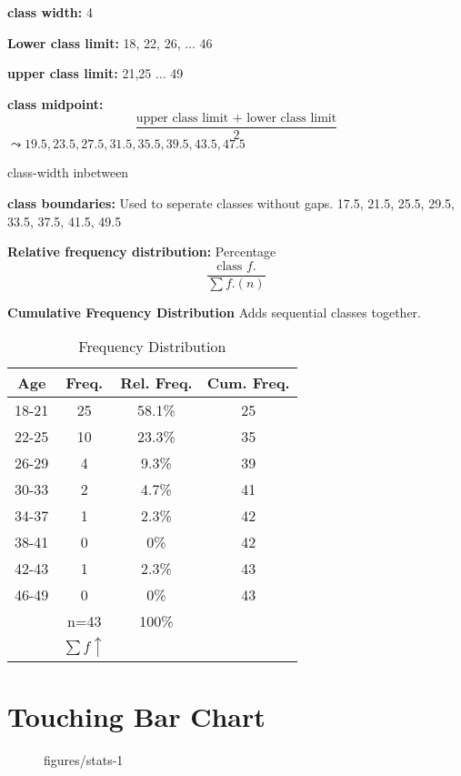 \documentclass{book}
\begin{document}
\begin{multicols}{2}
    

\textbf{class width:} 4

\textbf{Lower class limit:} 18, 22, 26, $\ldots$ 46

\textbf{upper class limit:} 21,25 $\ldots$ 49

\textbf{class midpoint:}
\[ \frac{\text{upper class limit + lower class limit}}{2}\] 
$\leadsto 19.5, 23.5, 27.5, 31.5, 35.5, 39.5, 43.5, 47.5$

class-width inbetween

\textbf{class boundaries:}
Used to seperate classes without gaps.
17.5, 21.5, 25.5, 29.5, 33.5, 37.5, 41.5, 49.5

\textbf{Relative frequency distribution:} Percentage \[\frac{\text{class } f.}{\sum f. (n)}\]

\textbf{Cumulative Frequency Distribution}
Adds sequential classes together.
\end{multicols}

\begin{table}[htbp]
    \centering
    \begin{tabular}{c|c|c|c}
        \toprule
        Age & Freq. & Rel. Freq. & Cum. Freq.\\
        \midrule
        18-21 & 25 & 58.1\% & 25  \\
        22-25 & 10 & 23.3\% & 35  \\
        26-29 & 4  & 9.3\%  & 39  \\
        30-33 & 2  & 4.7\%  & 41  \\
        34-37 & 1  & 2.3\%  & 42  \\
        38-41 & 0  & 0\%    & 42  \\
        42-43 & 1  & 2.3\%  & 43  \\
        46-49 & 0  & 0\%    & 43  \\
        \midrule
              & n=43 & 100\% \\
              & $\sum f \uparrow $ \\
              \bottomrule
    \end{tabular}
    \caption{Frequency Distribution}
\end{table}



\section{Touching Bar Chart}

\begin{figure}[ht]
    \centering
    \caption{figures/stats-1}
    \label{fig:stats-1}
\end{figure}
\end{document}

